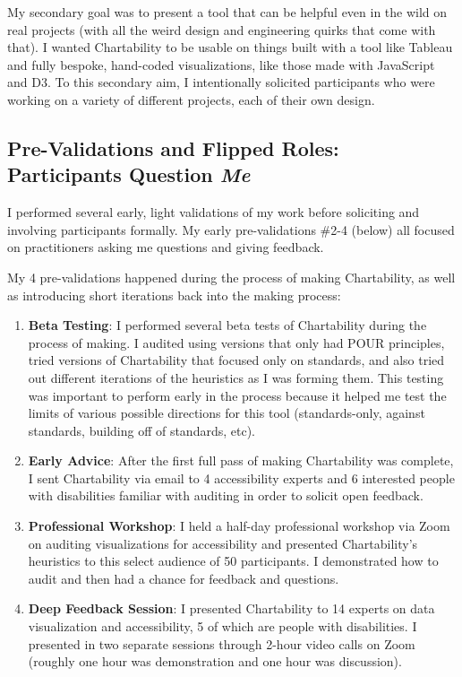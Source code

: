 \documentclass[12pt]{cmuthesis}
\begin{document}
My secondary goal was to present a tool that can be helpful even in the wild on real projects (with all the weird design and engineering quirks that come with that). I wanted Chartability to be usable on things built with a tool like Tableau and fully bespoke, hand-coded visualizations, like those made with JavaScript and D3. To this secondary aim, I intentionally solicited participants who were working on a variety of different projects, each of their own design. 

\subsection{Pre-Validations and Flipped Roles: Participants Question \emph{Me}}

I performed several early, light validations of my work before soliciting and involving participants formally. My early pre-validations \#2-4 (below) all focused on practitioners asking me questions and giving feedback. 

My 4 pre-validations happened during the process of making Chartability, as well as introducing short iterations back into the making process: 

\begin{enumerate}
    \item \textbf{Beta Testing}: I performed several beta tests of Chartability during the process of making. I audited using versions that only had POUR principles, tried versions of Chartability that focused only on standards, and also tried out different iterations of the heuristics as I was forming them. This testing was important to perform early in the process because it helped me test the limits of various possible directions for this tool (standards-only, against standards, building off of standards, etc).
    \item \textbf{Early Advice}: After the first full pass of making Chartability was complete, I sent Chartability via email to 4 accessibility experts and 6 interested people with disabilities familiar with auditing in order to solicit open feedback. 
    \item \textbf{Professional Workshop}: I held a half-day professional workshop via Zoom on auditing visualizations for accessibility and presented Chartability’s heuristics to this select audience of 50 participants. I demonstrated how to audit and then had a chance for feedback and questions.
    \item \textbf{Deep Feedback Session}: I presented Chartability to 14 experts on data visualization and accessibility, 5 of which are people with disabilities. I presented in two separate sessions through 2-hour video calls on Zoom (roughly one hour was demonstration and one hour was discussion). 
\end{enumerate}
\end{document}

